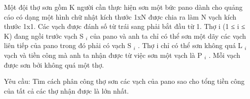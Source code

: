 Một đội thợ sơn gồm K người cần thực hiện sơn một bức pano dành cho quảng cáo có dạng một hình chữ nhật kích thước 1xN được chia ra làm N vạch kích thước 1x1. Các vạch được đánh số từ trái   sang phải bắt đầu từ 1. Thợ i (1 ≤ i ≤ K) đang ngồi trước vạch S   $_    i   $   của pano và anh ta chỉ có thể sơn một dãy các vạch liên tiếp của pano trong đó phải có vạch S   $_    i   $   . Thợ i chỉ có thể   sơn không quá L   $_    i   $   vạch và tiền công mà anh ta nhận được từ việc sơn một vạch là P   $_    i   $   . Mỗi vạch được sơn bởi không quá một thợ.  

   Yêu cầu: Tìm cách phân công thợ sơn các vạch của pano sao cho tổng tiền công của tất cả các thợ nhận được là lớn nhất.  

\